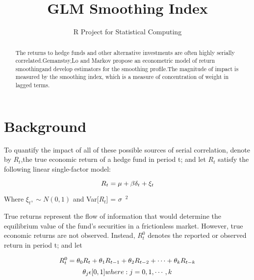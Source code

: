 \documentclass[12pt,letterpaper,english]{article}
\title{GLM Smoothing Index}
\author{R Project for Statistical Computing}
\begin{document}


\maketitle


\begin{abstract}
The returns to hedge funds and other alternative investments are often highly serially correlated.Gemanstsy,Lo and Markov propose an econometric model of return smoothingand develop estimators for the smoothing profile.The magnitude of impact is measured by the smoothing index, which is a measure of concentration of weight in lagged terms.
\end{abstract}



\section{Background}
To quantify the impact of all of these possible sources of serial correlation, denote by \(R_t\),the true economic return of a hedge fund in period t; and let \(R_t\) satisfy the following linear single-factor model:

\begin{equation}
 R_t  =   \\ {\mu} + {\beta}{{\delta}}_t+ \xi_t
\end{equation}

Where $\xi_t,  \sim N(0,1)$
and Var[\(R_t\)] = $\sigma$\ \(^2\)

True returns represent the flow of information that would determine the equilibrium value of the fund's securities in a frictionless market. However, true economic returns are not observed. Instead, \(R_t^0\) denotes the reported or observed return in period t; and let
  
\begin{equation}
 R_t^0  = \theta _0R_{t} + \theta _1R_{t-1}+\theta _2R_{t-2}  + \cdots +  \theta _kR_{t-k}\\
\end{equation}
\begin{equation}
\theta _j \epsilon [0,1] where : j = 0,1, \cdots , k  \\
\end{equation}
\end{document}
